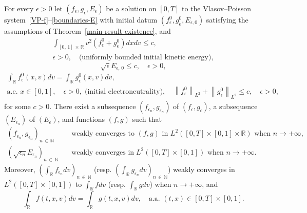 \documentclass[AHL,Unicode,longabstracts,published]{cedram}
\newcommand{\R}{\mathbb{R}}
\newcommand{\N}{\mathbb{N}}
\begin{document}
\begin{theo}\label{electroneutralite}
For every $\epsilon >0$ let $(f_{\epsilon },g_{\epsilon },E_{\epsilon })$ be a solution on $[0,T]$ to the Vlasov--Poisson system~\eqref{VP-f}--\eqref{boundaries-E} with initial datum $(f^0_{\epsilon },g^0_{\epsilon },E_{\epsilon,0})$ satisfying the assumptions of Theorem~\ref{main-result-existence}, and
\begin{multline}\label{initial-finite-kinetic-energy}
\int_{[0,\,1]\,\times\,\R } v^2 \left(f_{\epsilon }^0+g_{\epsilon }^0\right) dxdv \leq c, \\
\epsilon >0, \quad \text{(uniformly bounded initial kinetic energy)},
\end{multline}
\begin{equation}\label{uniform-bound-E-boundary}
\sqrt{\epsilon } E_{\epsilon,\,0} \leq c, \quad \epsilon >0, 
\end{equation}
\begin{multline}\label{assumption-initial-electroneutrality}
\int_{\R } f_{\epsilon }^0(x,v) dv
= \int_{\R } g_{\epsilon }^0(x,v) dv, \\ \text{a.e. }x\in [0,1],
\quad \epsilon >0, \;
 \text{(initial electroneutrality)},\quad
\left \| f_{\epsilon }^0 \right \|_{L^2} + \left \| g_{\epsilon }^0 \right \|_{L^2} \leq c, \quad \epsilon >0,
\end{multline}
for some $c>0$. There exist a subsequence $(f_{\epsilon _n}, g_{\epsilon _n})$ of $(f_{\epsilon },g_{\epsilon })$, a subsequence $(E_{\epsilon _n})$ of $(E_{\epsilon })$, and functions $(f,g)$ such that
\begin{align*}
\left(f_{\epsilon _n}, g_{\epsilon _n}\right)_{n\,\in\,\N}\quad &\text{weakly converges to } (f,g) \text{ in } L^2([0,T]\times [0,1] \times \R)\text{ when }n\rightarrow +\infty,\\
\left(\sqrt{\epsilon_n} E_{\epsilon_n}\right)_{n\,\in\, \N} \quad &\text{weakly converges } \text{in}\;L^2([0,T] \times [0,1])\text{ when }n\rightarrow +\infty.
\end{align*}
Moreover, $(\int_{\R } f_{\epsilon _n}dv)_{n\,\in\,\N }$ (resp. $(\int_{\R } g_{\epsilon _n}dv)_{n\,\in\,\N }$) weakly converges in $L^2([0,T] \times [0,1])$ to $\int_{\R } f dv$ (resp. $\int_{\R } g dv$) when $n\rightarrow +\infty $, and
\begin{equation}\label{eq-quasi-neutrality}
\int_{\R } f(t,x,v) dv = \int_{\R } g(t,x,v) dv, \quad \text{a.a. }(t,x) \in [0,T] \times [0,1].
\end{equation}
\end{theo}
\end{document}
